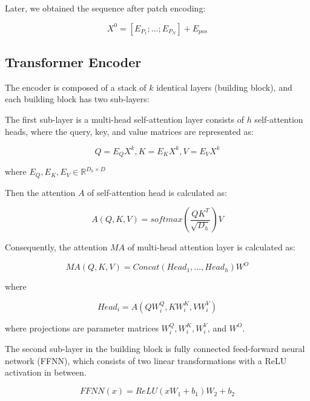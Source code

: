\documentclass{article}
\begin{document}
Later, we obtained the sequence after patch encoding:

\begin{equation}
  X^0 = [E_{P_1};...;E_{P_N}] + E_{pos}
  \label{eq:3}
\end{equation}

\subsection{Transformer Encoder}

The encoder is composed of a stack of $k$ identical layers (building block), and each building block has two sub-layers:

The first sub-layer is a multi-head self-attention layer consists of $h$ self-attention heads, where the query, key, and value matrices are represented as:

\begin{equation}
  Q = E_QX^k, K = E_KX^k, V = E_VX^k
  \label{eq:4}
\end{equation}

where $E_Q, E_K, E_V \in \mathbb{R}^{D_h \times D}$

Then the attention $A$ of self-attention head is calculated as:

\begin{equation}
  A(Q,K,V) = softmax(\frac{QK^T}{\sqrt{D_h}})V
  \label{eq:5}
\end{equation}

Consequently, the attention $MA$ of multi-head attention layer is calculated as:

\begin{equation}
  MA(Q,K,V) = Concat(Head_1,...,Head_h)W^O
  \label{eq:6}
\end{equation}

where

\begin{equation}
  Head_i = A(QW^Q_i,KW^K_i,VW^V_i)
  \label{eq:7}
\end{equation}

where projections are parameter matrices $W^Q_i, W^K_i, W^V_i$, and $W^O$.

The second sub-layer in the building block is fully connected feed-forward neural network (FFNN), which consists of two linear transformations with a ReLU activation in between.

\begin{equation}
  FFNN(x) = ReLU(xW_1 + b_1)W_2 + b_2
  \label{eq:8}
\end{equation}
\end{document}
